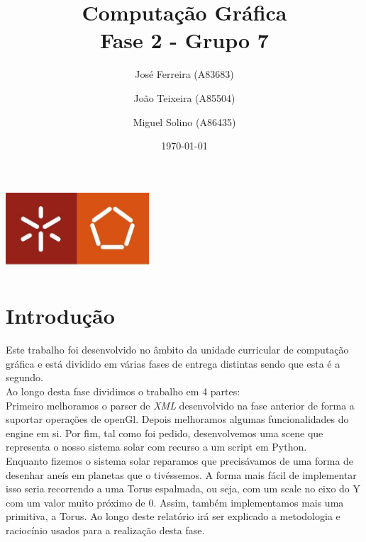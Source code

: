 \documentclass[a4paper]{report}
\begin{document}
\title{Computação Gráfica\\
\large Fase 2 - Grupo 7}
\author{José Ferreira (A83683) \and João Teixeira (A85504) \and Miguel Solino (A86435)}
\date{\today}

\begin{center}
    \begin{minipage}{0.75\linewidth}
        \centering
        \includegraphics[width=0.4\textwidth]{images/eng.jpeg}\par\vspace{1cm}
        \vspace{1.5cm}
        \href{https://www.uminho.pt/PT}
        {\color{black}{\scshape\LARGE Universidade do Minho}} \par
        \vspace{1cm}
        \href{https://www.di.uminho.pt/}
        {\color{black}{\scshape\Large Departamento de Informática}} \par
        \vspace{1.5cm}
        \maketitle
    \end{minipage}
\end{center}

\tableofcontents

\chapter{Introdução}
Este trabalho foi desenvolvido no âmbito da unidade curricular de computação
gráfica e está dividido em várias fases de entrega distintas sendo que esta é a
segundo.\\
Ao longo desta fase dividimos o trabalho em 4 partes:\\
Primeiro melhoramos o parser de \textit{XML} desenvolvido na fase anterior de
forma a suportar operações de openGl. Depois melhoramos algumas funcionalidades
do engine em si. Por fim, tal como foi pedido, desenvolvemos uma scene que
representa o nosso sistema solar com recurso a um script em Python.\\
Enquanto fizemos o sistema solar reparamos que precisávamos de uma forma de
desenhar aneís em planetas que o tivéssemos. A forma mais fácil
de implementar isso seria recorrendo a uma Torus espalmada, ou seja, com um
scale no eixo do Y com um valor muito próximo de 0. Assim, também implementamos
mais uma primitiva, a Torus.
Ao longo deste relatório irá ser explicado a metodologia e raciocínio usados
para a realização desta fase.\\
\end{document}
